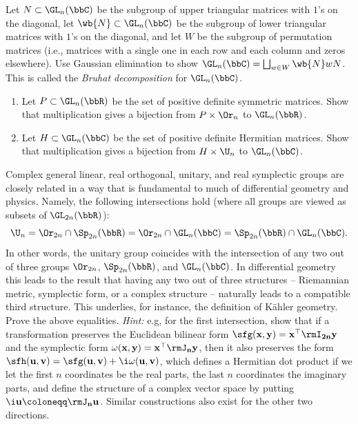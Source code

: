 \begin{xca}
    Let $N\subset \GL_n(\bbC)$ be the subgroup of upper triangular matrices with $1$'s on the diagonal, let $\wb{N}\subset \GL_n(\bbC)$ be the subgroup of lower triangular matrices with $1$'s on the diagonal, and let $W$ be the subgroup of permutation matrices (i.e., matrices with a single one in each row and each column and zeros elsewhere). Use Gaussian elimination to show $\GL_n(\bbC)=\bigsqcup_{w\in W}\wb{N}wN$. This is called the \emph{Bruhat decomposition} for $\GL_n(\bbC)$.
\end{xca}

\begin{xca}
    \begin{enumerate}[label=(\alph*)]
        \item Let $P\subset \GL_n(\bbR)$ be the set of positive definite symmetric matrices. Show that multiplication gives a bijection from $P\times \Or_n$ to $\GL_n(\bbR)$.
        \item Let $H\subset \GL_n(\bbC)$ be the set of positive definite Hermitian matrices. Show that multiplication gives a bijection from $H\times\U_n$ to $\GL_n(\bbC)$.
    \end{enumerate}
\end{xca}

\begin{xca}
    Complex general linear, real orthogonal, unitary, and real symplectic groups are closely related in a way that is fundamental to much of differential geometry and physics. Namely, the following intersections hold (where all groups are viewed as subsets of $\GL_{2n}(\bbR)$):
    \[\U_n=\Or_{2n}\cap \Sp_{2n}(\bbR)=\Or_{2n}\cap \GL_{n}(\bbC)=\Sp_{2n}(\bbR)\cap \GL_{n}(\bbC). \]
    In other words, the unitary group coincides with the intersection of any two out of three groups $\Or_{2n}$, $\Sp_{2n}(\bbR)$, and $\GL_{n}(\bbC)$. In differential geometry this leads to the result that having any two out of three structures -- Riemannian metric, symplectic form, or a complex structure -- naturally leads to a compatible third structure. This underlies, for instance, the definition of K\"ahler geometry. Prove the above equalities. \emph{Hint:} e.g, for the first intersection, show that if a transformation preserves the Euclidean bilinear form $\sfg(\bf x,\bf y)=\bf x^\top \rmI_{2n}\bf y$ and the symplectic form $\omega(\bf x,\bf y)=\bf x^\top \rmJ_n \bf y$, then it also preserves the form $\sfh(\bf u,\bf v)=\sfg(\bf u,\bf v)+\i\omega(\bf u,\bf v)$, which defines a Hermitian dot product if we let the first $n$ coordinates be the real parts, the last $n$ coordinates the imaginary parts, and define the structure of a complex vector space by putting $\i\bf u\coloneqq \rmJ_n \bf u$. Similar constructions also exist for the other two directions.
\end{xca}







